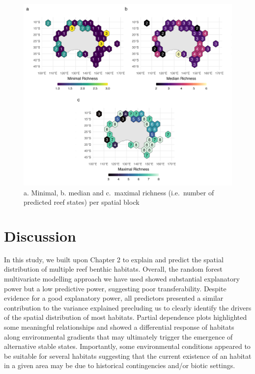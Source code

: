 \begin{refsection}
\begin{figure}
\hypertarget{fig:chap3fig4}{%
\centering
\includegraphics{03-Chapitre3/figures/09-Spatial-block-diversity.png}
\caption{a. Minimal, b. median and c.~maximal richness (i.e.~number of
predicted reef states) per spatial block}\label{fig:chap3fig4}
}
\end{figure}

\clearpage

\hypertarget{discussion-chapt3}{%
\section{Discussion}\label{discussion-chapt3}}

In this study, we built upon Chapter 2 to explain and predict the
spatial distribution of multiple reef benthic habitats. Overall, the
random forest multivariate modelling approach we have used showed
substantial explanatory power but a low predictive power, suggesting
poor transferability. Despite evidence for a good explanatory power, all
predictors presented a similar contribution to the variance explained
precluding us to clearly identify the drivers of the spatial
distribution of most habitats. Partial dependence plots highlighted some
meaningful relationships and showed a differential response of habitats
along environmental gradients that may ultimately trigger the emergence
of alternative stable states. Importantly, some environmental conditions
appeared to be suitable for several habitats suggesting that the current
existence of an habitat in a given area may be due to historical
contingencies and/or biotic settings.


\end{refsection}

